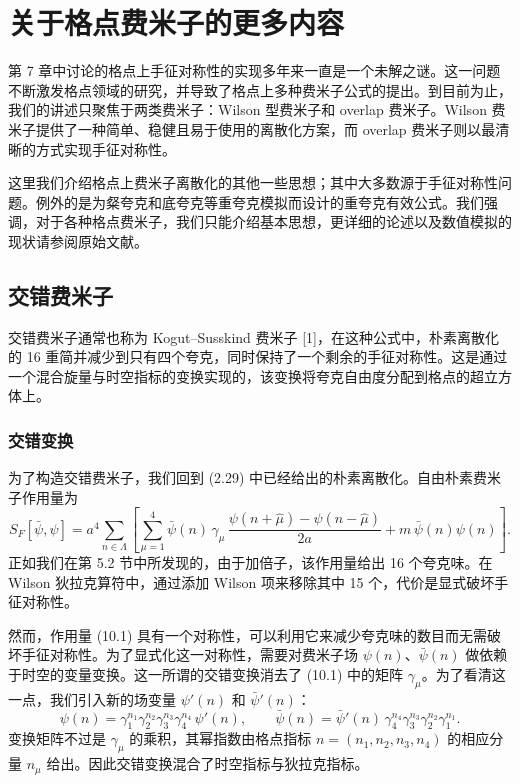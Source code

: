 
\chapter{关于格点费米子的更多内容}

第 7 章中讨论的格点上手征对称性的实现多年来一直是一个未解之谜。这一问题不断激发格点领域的研究，并导致了格点上多种费米子公式的提出。到目前为止，我们的讲述只聚焦于两类费米子：Wilson 型费米子和 overlap 费米子。Wilson 费米子提供了一种简单、稳健且易于使用的离散化方案，而 overlap 费米子则以最清晰的方式实现手征对称性。

这里我们介绍格点上费米子离散化的其他一些思想；其中大多数源于手征对称性问题。例外的是为粲夸克和底夸克等重夸克模拟而设计的重夸克有效公式。我们强调，对于各种格点费米子，我们只能介绍基本思想，更详细的论述以及数值模拟的现状请参阅原始文献。

\section{交错费米子}

交错费米子通常也称为 Kogut--Susskind 费米子 [1]，在这种公式中，朴素离散化的 16 重简并减少到只有四个夸克，同时保持了一个剩余的手征对称性。这是通过一个混合旋量与时空指标的变换实现的，该变换将夸克自由度分配到格点的超立方体上。

\subsection{交错变换}

为了构造交错费米子，我们回到 (2.29) 中已经给出的朴素离散化。自由朴素费米子作用量为
\begin{equation}
  S_F[\bar\psi, \psi] = a^4 \sum_{n\in\Lambda}
  \left[
    \sum_{\mu=1}^{4} \bar\psi(n)\, \gamma_\mu \,
    \frac{\psi(n+\hat\mu) - \psi(n-\hat\mu)}{2a}
    + m\,\bar\psi(n)\psi(n)
  \right] .
\end{equation}
正如我们在第 5.2 节中所发现的，由于加倍子，该作用量给出 16 个夸克味。在 Wilson 狄拉克算符中，通过添加 Wilson 项来移除其中 15 个，代价是显式破坏手征对称性。

然而，作用量 (10.1) 具有一个对称性，可以利用它来减少夸克味的数目而无需破坏手征对称性。为了显式化这一对称性，需要对费米子场 $\psi(n)$、$\bar\psi(n)$ 做依赖于时空的变量变换。这一所谓的交错变换消去了 (10.1) 中的矩阵 $\gamma_\mu$。为了看清这一点，我们引入新的场变量 $\psi'(n)$ 和 $\bar\psi'(n)$：
\begin{equation}
  \psi(n) = \gamma_1^{n_1}\gamma_2^{n_2}\gamma_3^{n_3}\gamma_4^{n_4}
  \,\psi'(n) , \qquad
  \bar\psi(n) = \bar\psi'(n)\,
  \gamma_4^{n_4}\gamma_3^{n_3}\gamma_2^{n_2}\gamma_1^{n_1} .
\end{equation}
变换矩阵不过是 $\gamma_\mu$ 的乘积，其幂指数由格点指标 $n = (n_1, n_2, n_3, n_4)$ 的相应分量 $n_\mu$ 给出。因此交错变换混合了时空指标与狄拉克指标。

